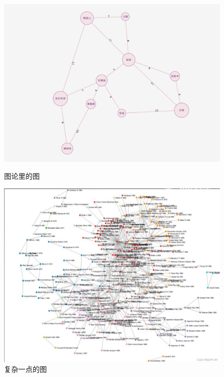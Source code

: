 \begin{figure}[ht]
  \centering
  \begin{minipage}[h]{0.45\textwidth}
    \includegraphics[width=\textwidth]{asset/54c020ae-39d8-4359-8f66-0d79cdcfc083.png}
    \caption{图论里的图}
    \label{fig:img6_2}
  \end{minipage}
  \hspace{1em}
  \begin{minipage}[h]{0.45\textwidth}
    \includegraphics[width=\textwidth]{asset/2d108889-bf01-45ae-ae0c-19a3daa5a757.png}
    \caption{复杂一点的图}
    \label{fig:img6_3}
  \end{minipage}
\end{figure}

